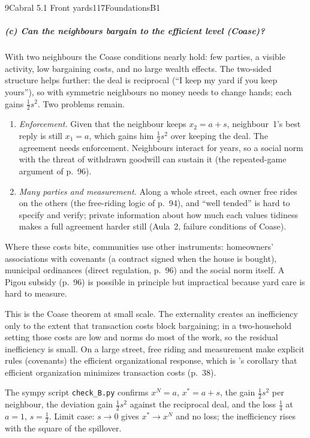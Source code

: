 \begin{exsol}{9}{Cabral 5.1 Front yards}{117}{Foundations}{B1}
\subparagraph{(c) Can the neighbours bargain to the efficient level (Coase)?} With two
neighbours the Coase conditions nearly hold: few parties, a visible activity, low bargaining
costs, and no large wealth effects. The two-sided structure helps further: the deal is
reciprocal (``I keep my yard if you keep yours''), so with symmetric neighbours no money needs to
change hands; each gains $\tfrac12 s^2$. Two problems remain.
\begin{enumerate}[label=(\roman*)]
  \item \emph{Enforcement.} Given that the neighbour keeps $x_2 = a+s$, neighbour~1's best
  reply is still $x_1 = a$, which gains him $\tfrac12 s^2$ over keeping the deal. The agreement
  needs enforcement. Neighbours interact for years, so a social norm with the threat of
  withdrawn goodwill can sustain it (the repeated-game argument of p.~96).
  \item \emph{Many parties and measurement.} Along a whole street, each owner free rides on the
  others (the free-riding logic of p.~94), and ``well tended'' is hard to specify and verify;
  private information about how much each values tidiness makes a full agreement harder still
  (Aula~2, failure conditions of Coase).
\end{enumerate}
Where these costs bite, communities use other instruments: homeowners' associations with
covenants (a contract signed when the house is bought), municipal ordinances (direct regulation,
p.~96) and the social norm itself. A Pigou subsidy (p.~96) is possible in principle but
impractical because yard care is hard to measure.

\interp This is the Coase theorem at small scale. The externality creates an inefficiency only
to the extent that transaction costs block bargaining; in a two-household setting those costs
are low and norms do most of the work, so the residual inefficiency is small. On a large street,
free riding and measurement make explicit rules (covenants) the efficient organizational
response, which is \MR's corollary that efficient organization minimizes transaction costs
(p.~38).

\verify The sympy script \texttt{check\_B.py} confirms $x^N = a$, $x^* = a+s$, the gain
$\tfrac12 s^2$ per neighbour, the deviation gain $\tfrac12 s^2$ against the reciprocal deal, and
the loss $\tfrac14$ at $a=1$, $s=\tfrac12$. Limit case: $s \to 0$ gives $x^* \to x^N$ and no
loss; the inefficiency rises with the square of the spillover.

\end{exsol}
